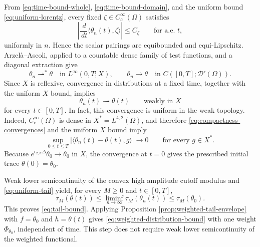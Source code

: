 \documentclass[11pt,reqno]{amsproc}
\newcommand{\Om}{\Omega}
\newcommand{\dd}{\,d}
\begin{document}
From \eqref{eq:time-bound-whole}, \eqref{eq:time-bound-domain}, and the uniform
bound \eqref{eq:uniform-lorentz}, every fixed $\zeta\in C_c^\infty(\Om)$
satisfies
\begin{equation}\label{eq:time-compactness}
 \left|\frac{\dd}{\dd t}
 \langle\theta_n(t),\zeta\rangle\right|
 \le C_\zeta
 \qquad\text{for a.e. }t,
\end{equation}
uniformly in $n$.  Hence the scalar pairings are equibounded and
equi-Lipschitz.  Arzel\`a--Ascoli, applied to a countable dense family of test
functions, and a diagonal extraction give
\begin{equation}\label{eq:compactness-convergences}
 \theta_n\rightharpoonup^\ast\theta
 \quad\text{in }L^\infty(0,T;X),
 \qquad
 \theta_n\longrightarrow\theta
 \quad\text{in }C([0,T];\mathcal D'(\Om)).
\end{equation}
Since $X$ is reflexive, convergence in distributions at a fixed time,
together with the uniform $X$ bound, implies
\[
  \theta_n(t)\rightharpoonup\theta(t)
  \qquad\text{weakly in }X
\]
for every $t\in[0,T]$.  In fact, this convergence is uniform in the weak
topology.  Indeed, $C_c^\infty(\Om)$ is dense in
$X^*=L^{4,2}(\Om)$, and therefore \eqref{eq:compactness-convergences} and the
uniform $X$ bound imply
\begin{equation}\label{eq:weak-X-uniform}
  \sup_{0\leq t\leq T}
  |\langle\theta_n(t)-\theta(t),g\rangle|
  \longrightarrow0
  \qquad\text{for every }g\in X^*.
\end{equation}
Because $e^{\epsilon_{2,n}\Delta}\theta_0\to\theta_0$ in $X$, the
convergence at $t=0$ gives the prescribed initial trace
$\theta(0)=\theta_0$.

Weak lower semicontinuity of the convex high amplitude cutoff modulus and
\eqref{eq:uniform-tail} yield, for every $M\geq0$ and $t\in[0,T]$,
\begin{equation}\label{eq:limit-tail-inheritance}
  \tau_M(\theta(t))
  \leq\liminf_{n\to\infty}\tau_M(\theta_n(t))
  \leq\tau_M(\theta_0).
\end{equation}
This proves \eqref{eq:tail-bound}.  Applying Proposition
\ref{prop:weighted-tail-envelope} with $f=\theta_0$ and $h=\theta(t)$ gives
\eqref{eq:weighted-distribution-bound} with one weight
$\Phi_{\theta_0}$, independent of time.  This step does not require weak lower semicontinuity of 
the weighted functional.
\end{document}
